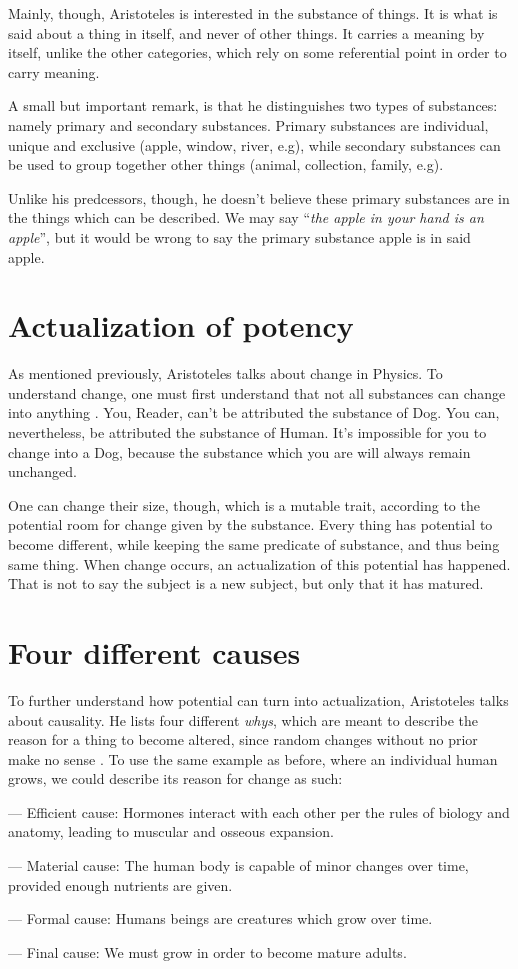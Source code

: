 \documentclass{myassignment}
\begin{document}
Mainly, though, Aristoteles is interested in the substance of things. It is what is said about a thing in itself, and never of other things. It carries a meaning by itself, unlike the other categories, which rely on some referential point in order to carry meaning.

A small but important remark, is that he distinguishes two types of substances: namely primary and secondary substances. Primary substances are individual, unique and exclusive (apple, window, river, e.g), while secondary substances can be used to group together other things (animal, collection, family, e.g).

Unlike his predcessors, though, he doesn't believe these primary substances are in the things which can be described. We may say ``\textit{the apple in your hand is an apple}'', but it would be wrong to say the primary substance apple is in said apple.

\section{Actualization of potency}
As mentioned previously, Aristoteles talks about change in Physics. To understand change, one must first understand that not all substances can change into anything \autocite{aristoteles-physics}. You, Reader, can't be attributed the substance of Dog. You can, nevertheless, be attributed the substance of Human. It's impossible for you to change into a Dog, because the substance which you are will always remain unchanged.

One can change their size, though, which is a mutable trait, according to the potential room for change given by the substance. Every thing has potential to become different, while keeping the same predicate of substance, and thus being same thing. When change occurs, an actualization of this potential has happened. That is not to say the subject is a new subject, but only that it has matured.

\section{Four different causes}
To further understand how potential can turn into actualization, Aristoteles talks about causality. He lists four different \textit{whys}, which are meant to describe the reason for a thing to become altered, since random changes without no prior make no sense \autocite{sep-aristotle-causality}. To use the same example as before, where an individual human grows, we could describe its reason for change as such:

--- Efficient cause: Hormones interact with each other per the rules of biology and anatomy, leading to muscular and osseous expansion.

--- Material cause: The human body is capable of minor changes over time, provided enough nutrients are given.

--- Formal cause: Humans beings are creatures which grow over time.

--- Final cause: We must grow in order to become mature adults.


\printbibliography
\end{document}
